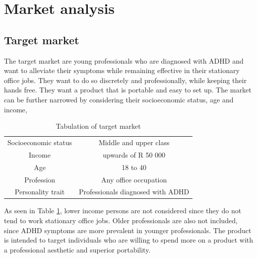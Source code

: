 \documentclass{article}
\begin{document}
\large
\section{Market analysis}
    \subsection{Target market}

        The target market are young professionals who are diagnosed with ADHD and want to alleviate their symptoms while remaining effective in their stationary office jobs. They want to do so discretely and professionally, while keeping their hands free. They want a product that is portable and easy to set up. The market can be further narrowed by considering their socioeconomic status, age and income,

        \begin{table}[htbp]
            \centering
            \caption{Tabulation of target market}
            \begin{tabular}{c|c}
                \hline
                 Socioeconomic status   & Middle and upper class  \\
                 Income                 & upwards of R 50 000 \\
                 Age                    & 18 to 40\\
                 Profession             & Any office occupation\\
                 Personality trait      & Professionals diagnosed with ADHD\\
                 \hline
            \end{tabular}
            
            \label{tab:market}
        \end{table}

        As seen in Table \ref{tab:market}, lower income persons are not considered since they do not tend to work stationary office jobs. Older professionals are also not included, since ADHD symptoms are more prevalent in younger professionals. The product is intended to target individuals who are willing to spend more on a product with a professional aesthetic and superior portability. 
       
\end{document}
